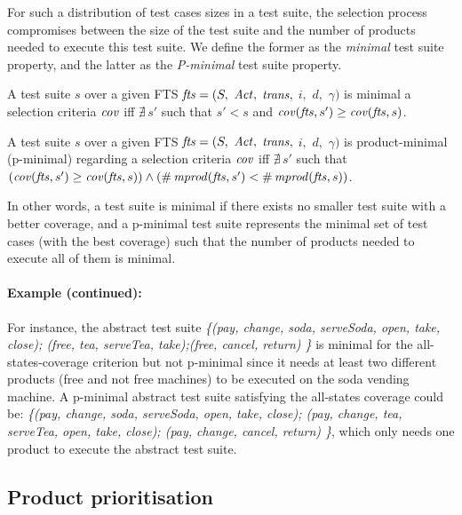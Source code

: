 For such a distribution of test cases sizes in a test suite, the selection process compromises between the size of the test suite and the number of products needed to execute this test suite. We define the former as the \emph{minimal} test suite property, and the latter as the \emph{P-minimal} test suite property. 

\begin{property}
A test suite $s$ over a given FTS $\mathit{fts} = (S,$ $\mathit{Act},$ $\mathit{trans},$ $i,$ $d,$ $\gamma) $ is minimal \wrt a selection criteria $\mathit{cov}$ iff $\nexists \, s'$ such that $s' < s$ and $\mathit{cov}(\mathit{fts}, s') \geq \mathit{cov}(\mathit{fts}, s) $.
\end{property}

\begin{property}
A test suite $s$ over a given FTS $\mathit{fts} = (S,$ $\mathit{Act},$ $\mathit{trans},$ $i,$ $d,$ $\gamma) $ is product-minimal (p-minimal) regarding a selection criteria $\mathit{cov}$ iff $\nexists \, s' $ such that $(\mathit{cov}(\mathit{fts}, s') \geq \mathit{cov}(\mathit{fts}, s)) \wedge (\# \,\mathit{mprod}(\mathit{fts}, s') < \# \, \mathit{mprod}(\mathit{fts},s))$. 
\end{property}

In other words, a test suite is minimal if there exists no smaller test suite with a better coverage, and a p-minimal test suite represents the minimal set of test cases (with the best coverage) such that the number of products needed to execute all of them is minimal.

\paragraph{Example (continued):} 

For instance, the abstract test suite \textit{\{(pay, change, soda, serve\-Soda, open, take, close); (free, tea, serve\-Tea, take);(free, cancel, return) \}} is minimal for the all-states-coverage criterion but not p-minimal since it needs at least two different products (\ie  free and not free machines) to be executed on the soda vending machine. A p-minimal abstract test suite satisfying the all-states coverage could be:  \textit{\{(pay, change, soda, serve\-Soda, open, take, close); (pay, change, tea, serve\-Tea, open, take, close); (pay, change, cancel, return) \}}, which only needs one product to execute the abstract test suite.


\subsection{Product prioritisation}

